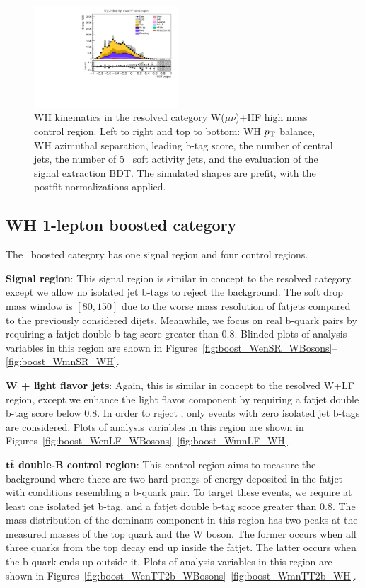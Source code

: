 \begin{figure}[tbp]
\begin{center}
    \includegraphics[width=0.48\textwidth]{figures/wlnhbb2016/resolved/WmnWHHeavyFlavorCRHighMass_bdtValue.pdf}
    \caption{WH kinematics in the resolved category W($\mu\nu$)+HF high mass control region.
    Left to right and top to bottom: WH $p_{\mathrm{T}}$ balance, WH azimuthal separation, leading b-tag score, the number of central jets,
    the number of 5 \GeV\ soft activity jets, and the evaluation of the signal extraction BDT.
    The simulated shapes are prefit, with the postfit normalizations applied.}
    \label{fig:res_WmnHFHighMass_WH}
  \end{center}
\end{figure}
\clearpage

\subsection{WH 1-lepton boosted category}
The \WlnH\ boosted category has one signal region and four control regions.

\textbf{Signal region}: This signal region is similar in concept to the resolved category, except we allow no
isolated jet b-tags to reject the \ttbar background. The soft drop mass window is $[80,150]$ due to the worse
mass resolution of fatjets compared to the previously considered dijets. Meanwhile,
we focus on real b-quark pairs by requiring a fatjet double b-tag score greater than 0.8.
Blinded plots of analysis variables in this region are shown in Figures~\ref{fig:boost_WenSR_WBosons}--\ref{fig:boost_WmnSR_WH}.

\textbf{W + light flavor jets}: Again, this is similar in concept to the resolved W+LF region,
except we enhance the light flavor component by requiring a fatjet double b-tag score below 0.8.
In order to reject \ttbar, only events with zero isolated jet b-tags are considered.
Plots of analysis variables in this region are shown in Figures~\ref{fig:boost_WenLF_WBosons}--\ref{fig:boost_WmnLF_WH}.

\textbf{$\mathbf{t\bar{t}}$ double-B control region}: This control region aims to measure the \ttbar background where there
are two hard prongs of energy deposited in the fatjet with conditions resembling a b-quark pair.
To target these events, we require at least one isolated jet b-tag, and a fatjet double b-tag score greater
than 0.8. The mass distribution of the dominant \ttbar component in this region has two peaks at the measured masses of the
top quark and the W boson. The former occurs when all three quarks from the top decay end up inside the fatjet.
The latter occurs when the b-quark ends up outside it.
Plots of analysis variables in this region are shown in Figures~\ref{fig:boost_WenTT2b_WBosons}--\ref{fig:boost_WmnTT2b_WH}.

